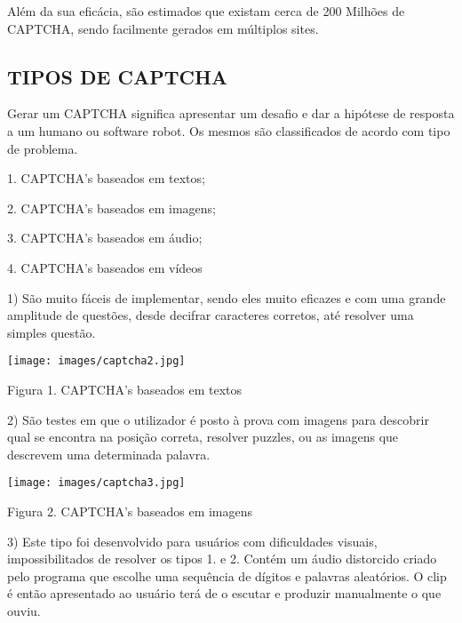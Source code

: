 \documentclass{article}
\begin{document}
  

	Além da sua eficácia, são estimados que existam cerca de 200 Milhões de CAPTCHA, sendo facilmente gerados em múltiplos sites.  
\subsection{TIPOS DE CAPTCHA}
Gerar um CAPTCHA significa apresentar um desafio e dar a hipótese de resposta a um humano ou software robot. Os mesmos são classificados de acordo com tipo de problema\cite{2}.  \newline

  

	1. CAPTCHA's baseados em textos;
    

	2. CAPTCHA's baseados em imagens; 

	3. CAPTCHA's baseados em áudio; 

	4. CAPTCHA's baseados em vídeos\newline\newline
	
1) São muito fáceis de implementar, sendo eles muito eficazes e com uma grande amplitude de questões, desde decifrar caracteres corretos, até resolver uma simples questão.\newline
\begin{center}
   \texttt{[image: images/captcha2.jpg]}
   \newline
    \caption{Figura 1. CAPTCHA's baseados em textos}
    \label{fig:my_label}    
\end{center}



2) São testes em que o utilizador é posto à prova com imagens para descobrir qual se encontra na posição correta, resolver puzzles, ou as imagens que descrevem uma determinada palavra.\newline
\begin{center}
   \texttt{[image: images/captcha3.jpg]}
   \newline
    \caption{Figura 2. CAPTCHA's baseados em imagens}
    \label{fig:my_label}    
\end{center}

3) Este tipo foi desenvolvido para usuários com dificuldades visuais, impossibilitados de resolver os tipos 1. e 2. Contém um áudio distorcido criado pelo programa que escolhe uma sequência de dígitos e palavras aleatórios. O clip é então apresentado ao usuário terá de o escutar e produzir manualmente o que ouviu.\newline
\end{document}
